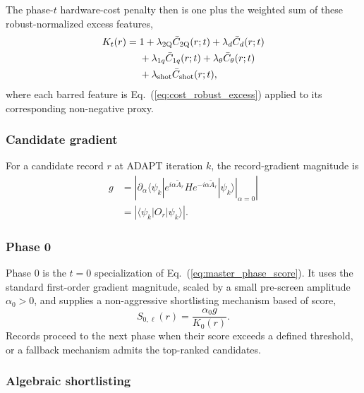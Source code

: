 \documentclass[
  reprint,
  amsmath,
  amssymb,
  aps,
  pra,
  nofootinbib,
  superscriptaddress,
  floatfix
]{revtex4-2}
\newcommand{\twq}{\mathrm{2Q}}
\begin{document}
The phase-$t$ hardware-cost penalty then is one plus the weighted sum of these robust-normalized excess features,
\begin{equation}
\begin{aligned}
K_t(r)
={}&
1+\lambda_{\twq}\bar C_{\twq}(r;t)
+\lambda_d \bar C_d(r;t)\\
&+\lambda_{1q}\bar C_{1q}(r;t)
 +\lambda_\theta \bar C_\theta(r;t)\\
&+\lambda_{\rm shot}\bar C_{\rm shot}(r;t),
\end{aligned}
\label{eq:hardware_cost_sum}
\end{equation}
where each barred feature is Eq.~(\ref{eq:cost_robust_excess}) applied to its corresponding non-negative proxy.

\subsubsection{Candidate gradient}

For a candidate record $r$ at ADAPT iteration $k$, the record-gradient magnitude is
\begin{equation}
\begin{aligned}
g
&=
\left|
\left.
\partial_\alpha
\langle\psi_k|
e^{i\alpha\widetilde A_r}
H
e^{-i\alpha\widetilde A_r}
|\psi_k\rangle
\right|_{\alpha=0}
\right|\\
&=
\left|\langle\psi_k|O_r|\psi_k\rangle\right| .
\end{aligned}
\label{eq:record_gradient}
\end{equation}

\subsubsection{Phase 0}

Phase 0 is the $t=0$ specialization of Eq.~(\ref{eq:master_phase_score}). It uses the standard first-order gradient magnitude, scaled by a small pre-screen amplitude $\alpha_0>0$, and supplies a non-aggressive shortlisting mechanism based of score,
\begin{equation}
S_{0,\ell}(r)=\frac{\alpha_0 g}{K_0(r)}.
\label{eq:phase0_score}
\end{equation}
Records proceed to the next phase when their score exceeds a defined threshold, or a fallback mechanism admits the top-ranked candidates.

\subsubsection{Algebraic shortlisting}
\label{sec:snake_algebraic_shortlisting}
\end{document}
